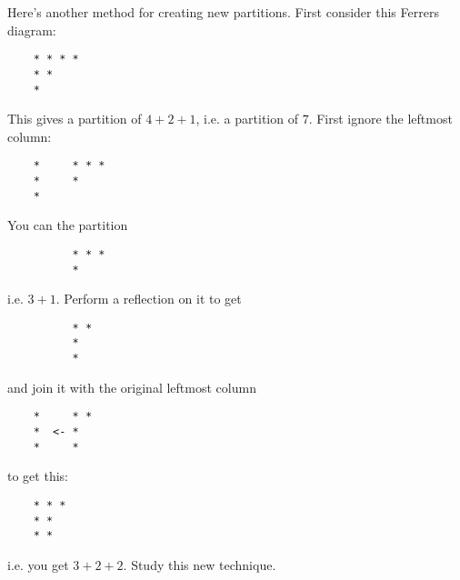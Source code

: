 Here's another method for creating new partitions.
First consider this Ferrers diagram:
\begin{verbatim}
    * * * *
    * * 
    *
\end{verbatim}
This gives a partition of $4 + 2 + 1$, i.e. a partition of $7$.
First ignore the leftmost column:
\begin{verbatim}
    *     * * *
    *     * 
    *
\end{verbatim}
You can the partition 
\begin{verbatim}
          * * *
          * 
\end{verbatim}
i.e. $3 + 1$.
Perform a reflection on it to get
\begin{verbatim}
          * *
          *
          * 
\end{verbatim}
and join it with the original leftmost column 
\begin{verbatim}
    *     * *
    *  <- *   
    *     *
\end{verbatim}
to get this:
\begin{verbatim}
    * * *
    * *   
    * *
\end{verbatim}
i.e. you get $3 + 2 + 2$.
Study this new technique.
